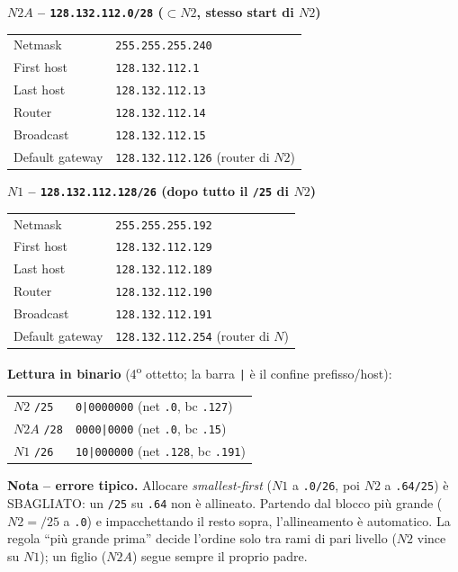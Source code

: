 \documentclass{report}
\begin{document}
\begin{solution}
\noindent\textbf{$N2A$ -- \texttt{128.132.112.0/28} ($\subset N2$, stesso start di $N2$)}
\begin{center}
\begin{tabular}{ll}
\hline
Netmask & \texttt{255.255.255.240} \\
First host & \texttt{128.132.112.1} \\
Last host & \texttt{128.132.112.13} \\
Router & \texttt{128.132.112.14} \\
Broadcast & \texttt{128.132.112.15} \\
Default gateway & \texttt{128.132.112.126} (router di $N2$) \\
\hline
\end{tabular}
\end{center}

\noindent\textbf{$N1$ -- \texttt{128.132.112.128/26} \;(dopo tutto il \texttt{/25} di $N2$)}
\begin{center}
\begin{tabular}{ll}
\hline
Netmask & \texttt{255.255.255.192} \\
First host & \texttt{128.132.112.129} \\
Last host & \texttt{128.132.112.189} \\
Router & \texttt{128.132.112.190} \\
Broadcast & \texttt{128.132.112.191} \\
Default gateway & \texttt{128.132.112.254} (router di $N$) \\
\hline
\end{tabular}
\end{center}

\textbf{Lettura in binario} (4\textsuperscript{o} ottetto; la barra \texttt{|} è il
confine prefisso/host):
\begin{center}
\begin{tabular}{ll}
\hline
$N2$ \texttt{/25}  & \texttt{0|0000000} \;(net \texttt{.0}, bc \texttt{.127}) \\
$N2A$ \texttt{/28} & \texttt{0000|0000} \;(net \texttt{.0}, bc \texttt{.15}) \\
$N1$ \texttt{/26}  & \texttt{10|000000} \;(net \texttt{.128}, bc \texttt{.191}) \\
\hline
\end{tabular}
\end{center}

\textbf{Nota -- errore tipico.} Allocare \emph{smallest-first} ($N1$ a
\texttt{.0/26}, poi $N2$ a \texttt{.64/25}) è SBAGLIATO: un \texttt{/25} su
\texttt{.64} non è allineato. Partendo dal blocco più grande ($N2=/25$ a
\texttt{.0}) e impacchettando il resto sopra, l'allineamento è automatico. La
regola ``più grande prima'' decide l'ordine solo tra rami di pari livello ($N2$
vince su $N1$); un figlio ($N2A$) segue sempre il proprio padre.
\end{solution}
\end{document}
